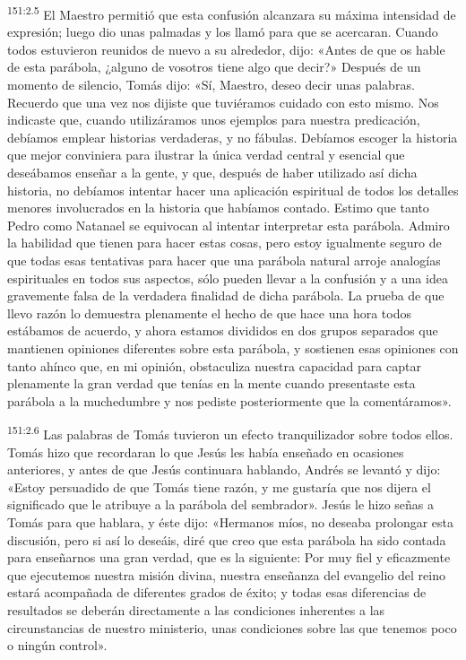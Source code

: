 \par 
\textsuperscript{151:2.5} El Maestro permitió que esta confusión alcanzara su máxima intensidad de expresión; luego dio unas palmadas y los llamó para que se acercaran. Cuando todos estuvieron reunidos de nuevo a su alrededor, dijo: «Antes de que os hable de esta parábola, ¿alguno de vosotros tiene algo que decir?» Después de un momento de silencio, Tomás dijo: «Sí, Maestro, deseo decir unas palabras. Recuerdo que una vez nos dijiste que tuviéramos cuidado con esto mismo. Nos indicaste que, cuando utilizáramos unos ejemplos para nuestra predicación, debíamos emplear historias verdaderas, y no fábulas. Debíamos escoger la historia que mejor conviniera para ilustrar la única verdad central y esencial que deseábamos enseñar a la gente, y que, después de haber utilizado así dicha historia, no debíamos intentar hacer una aplicación espiritual de todos los detalles menores involucrados en la historia que habíamos contado. Estimo que tanto Pedro como Natanael se equivocan al intentar interpretar esta parábola. Admiro la habilidad que tienen para hacer estas cosas, pero estoy igualmente seguro de que todas esas tentativas para hacer que una parábola natural arroje analogías espirituales en todos sus aspectos, sólo pueden llevar a la confusión y a una idea gravemente falsa de la verdadera finalidad de dicha parábola. La prueba de que llevo razón lo demuestra plenamente el hecho de que hace una hora todos estábamos de acuerdo, y ahora estamos divididos en dos grupos separados que mantienen opiniones diferentes sobre esta parábola, y sostienen esas opiniones con tanto ahínco que, en mi opinión, obstaculiza nuestra capacidad para captar plenamente la gran verdad que tenías en la mente cuando presentaste esta parábola a la muchedumbre y nos pediste posteriormente que la comentáramos».

\par 
\textsuperscript{151:2.6} Las palabras de Tomás tuvieron un efecto tranquilizador sobre todos ellos. Tomás hizo que recordaran lo que Jesús les había enseñado en ocasiones anteriores, y antes de que Jesús continuara hablando, Andrés se levantó y dijo: «Estoy persuadido de que Tomás tiene razón, y me gustaría que nos dijera el significado que le atribuye a la parábola del sembrador». Jesús le hizo señas a Tomás para que hablara, y éste dijo: «Hermanos míos, no deseaba prolongar esta discusión, pero si así lo deseáis, diré que creo que esta parábola ha sido contada para enseñarnos una gran verdad, que es la siguiente: Por muy fiel y eficazmente que ejecutemos nuestra misión divina, nuestra enseñanza del evangelio del reino estará acompañada de diferentes grados de éxito; y todas esas diferencias de resultados se deberán directamente a las condiciones inherentes a las circunstancias de nuestro ministerio, unas condiciones sobre las que tenemos poco o ningún control».

